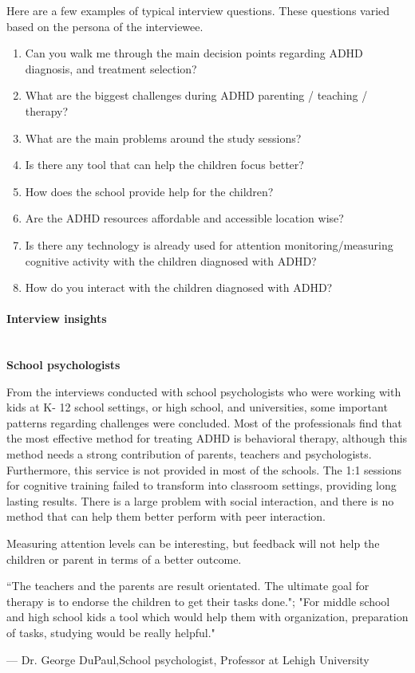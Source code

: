 \documentclass[letterpaper,10pt]{article}
\begin{document}
Here are a few examples of typical interview questions. These questions varied based on the persona of the interviewee.

\begin{enumerate}
  \item Can you walk me through the main decision points regarding ADHD diagnosis, and treatment selection?
  \item What are the biggest challenges during ADHD parenting / teaching / therapy?
  \item What are the main problems around the study sessions?
  \item Is there any tool that can help the children focus better?
  \item How does the school provide help for the children?
  \item Are the ADHD resources affordable and accessible location wise?
  \item Is there any technology is already used for attention monitoring/measuring cognitive activity with the children diagnosed with ADHD?
  \item How do you interact with the children diagnosed with ADHD?
\end{enumerate}


\paragraph{Interview insights} \\

\textbf{School psychologists}

From the interviews conducted with school psychologists who were working with kids at K- 12 school settings, or high school, and universities, some important patterns regarding challenges were concluded. Most of the professionals find that the most effective method for treating ADHD is behavioral therapy, although this method needs a strong contribution of parents, teachers and psychologists. Furthermore, this service is not provided in most of the schools. The 1:1 sessions for cognitive training failed to transform into classroom settings, providing long lasting results. There is a large problem with social interaction, and there is no method that can help them better perform with peer interaction. 

Measuring attention levels can be interesting, but feedback will not help the children or parent in terms of a better outcome. 


\textcolor{myblue}{\epigraph{``The teachers and the parents are result orientated. The ultimate goal for therapy is to endorse the children to get their tasks done."; "For middle school and high school kids a tool which would help them with organization, preparation of tasks, studying would be really helpful."}{--- \textup{Dr. George DuPaul},School psychologist, Professor at Lehigh University}}
\end{document}

